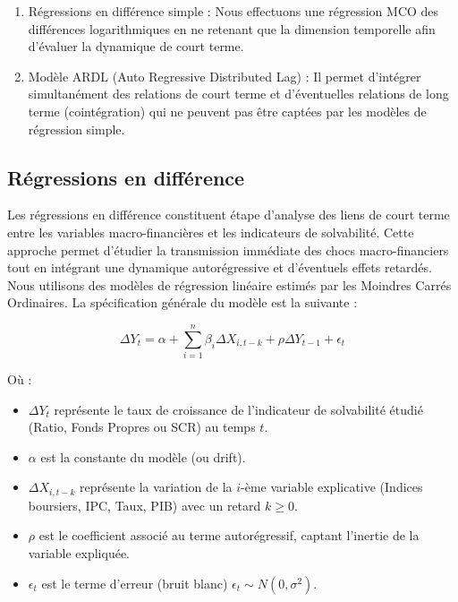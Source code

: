 \documentclass[
]{article}
\begin{document}
\begin{enumerate}
  \item \textbf{}Régressions en différence simple : Nous effectuons une régression MCO des différences logarithmiques en ne retenant que la dimension temporelle afin d'évaluer la dynamique de court terme.
  \item \textbf{}Modèle ARDL (Auto Regressive Distributed Lag) : Il permet d'intégrer simultanément des relations de court terme et d'éventuelles relations de long terme (cointégration) qui ne peuvent pas être captées par les modèles de régression simple.
\end{enumerate}

\subsection{Régressions en
différence}\label{ruxe9gressions-en-diffuxe9rence}

Les régressions en différence constituent étape d'analyse des liens de
court terme entre les variables macro-financières et les indicateurs de
solvabilité. Cette approche permet d'étudier la transmission immédiate
des chocs macro-financiers tout en intégrant une dynamique
autorégressive et d'éventuels effets retardés. Nous utilisons des
modèles de régression linéaire estimés par les Moindres Carrés
Ordinaires. La spécification générale du modèle est la suivante :

\begin{equation}
\Delta Y_t = \alpha + \sum_{i=1}^{n} \beta_i \Delta X_{i, t-k} + \rho \Delta Y_{t-1} + \epsilon_t
\end{equation}

Où :

\begin{itemize}
    \item $\Delta Y_t$ représente le taux de croissance de l'indicateur de solvabilité étudié (Ratio, Fonds Propres ou SCR) au temps $t$.
    \item $\alpha$ est la constante du modèle (ou drift).
    \item $\Delta X_{i, t-k}$ représente la variation de la $i$-ème variable explicative (Indices boursiers, IPC, Taux, PIB) avec un retard $k \geq 0$.
    \item $\rho$ est le coefficient associé au terme autorégressif, captant l'inertie de la variable expliquée.
    \item $\epsilon_t$ est le terme d'erreur (bruit blanc) $\epsilon_t \sim N(0, \sigma^2)$.
\end{itemize}
\end{document}
